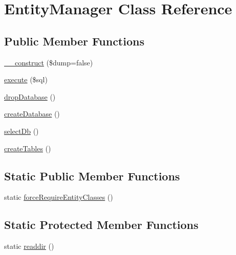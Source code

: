 \hypertarget{classapp_1_1models_1_1_entity_manager}{\section{Entity\-Manager Class Reference}
\label{classapp_1_1models_1_1_entity_manager}
}
\subsection*{Public Member Functions}
\begin{DoxyCompactItemize}
\item 
\hyperlink{classapp_1_1models_1_1_entity_manager_ab35c6441c626a41d1fb32fb2472bf658}{\-\_\-\-\_\-construct} (\$dump=false)
\item 
\hyperlink{classapp_1_1models_1_1_entity_manager_a24bba973a1b68c97d2e04175fb4a344b}{execute} (\$sql)
\item 
\hyperlink{classapp_1_1models_1_1_entity_manager_a4444ee2ac45cbcee4fb9309ddf48276c}{drop\-Database} ()
\item 
\hyperlink{classapp_1_1models_1_1_entity_manager_a0bafc21f9e81182323fab395c762a92d}{create\-Database} ()
\item 
\hyperlink{classapp_1_1models_1_1_entity_manager_a0bce05c01597c81c7ad49091d9bf9721}{select\-Db} ()
\item 
\hyperlink{classapp_1_1models_1_1_entity_manager_a304134b6813711cc494c0c51b08ac529}{create\-Tables} ()
\end{DoxyCompactItemize}
\subsection*{Static Public Member Functions}
\begin{DoxyCompactItemize}
\item 
static \hyperlink{classapp_1_1models_1_1_entity_manager_a785a44d0caa4e6fc6682fd1e746a4a86}{force\-Require\-Entity\-Classes} ()
\end{DoxyCompactItemize}
\subsection*{Static Protected Member Functions}
\begin{DoxyCompactItemize}
\item 
static \hyperlink{classapp_1_1models_1_1_entity_manager_addad7978793389f202360c1b4de5aa34}{readdir} ()
\end{DoxyCompactItemize}


